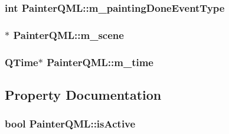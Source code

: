 \subsubsection[{m\+\_\+painting\+Done\+Event\+Type}]{\setlength{\rightskip}{0pt plus 5cm}int Painter\+Q\+M\+L\+::m\+\_\+painting\+Done\+Event\+Type\hspace{0.3cm}{\ttfamily [protected]}}\label{class_painter_q_m_l_a7a6641710573e4fa47dfdae13e87d58e}
\hypertarget{class_painter_q_m_l_a5eccac2ab6d9974a9ae94573ac7b19d6}{}
\subsubsection[{m\+\_\+scene}]{$\ast$ Painter\+Q\+M\+L\+::m\+\_\+scene\hspace{0.3cm}{\ttfamily [protected]}}\label{class_painter_q_m_l_a5eccac2ab6d9974a9ae94573ac7b19d6}
\hypertarget{class_painter_q_m_l_ad4ced718f47b69f2344a5311ec87a156}{}
\subsubsection[{m\+\_\+time}]{\setlength{\rightskip}{0pt plus 5cm}Q\+Time$\ast$ Painter\+Q\+M\+L\+::m\+\_\+time\hspace{0.3cm}{\ttfamily [protected]}}\label{class_painter_q_m_l_ad4ced718f47b69f2344a5311ec87a156}


\subsection{Property Documentation}
\hypertarget{class_painter_q_m_l_aab9bd8451a3cbfe6e8189994fd3dc329}{}
\subsubsection[{is\+Active}]{\setlength{\rightskip}{0pt plus 5cm}bool Painter\+Q\+M\+L\+::is\+Active\hspace{0.3cm}{\ttfamily [read]}}\label{class_painter_q_m_l_aab9bd8451a3cbfe6e8189994fd3dc329}
\hypertarget{class_painter_q_m_l_a70ad19e1bbe24b9915c5f23366549a15}{}
